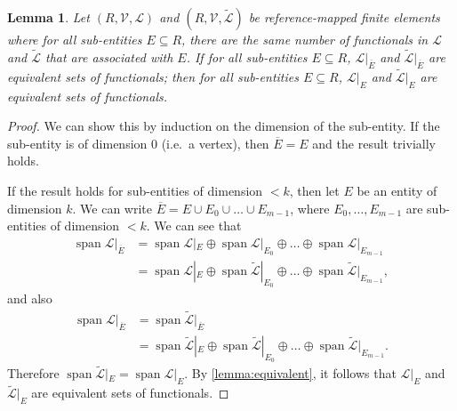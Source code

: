 \documentclass[sn-mathphys-num]{sn-jnl}%
\theoremstyle{thmstyleone}%
\newtheorem{lemma}{Lemma}%
\newcommand{\closure}[1]{\overline{#1}}
\newcommand{\subentity}{E}
\newcommand{\refel}{R}
\newcommand{\polyspace}{\mathcal{V}}
\newcommand{\dualbasis}{\mathcal{L}}
\theoremstyle{thmstyletwo}%
\theoremstyle{thmstylethree}%
\begin{document}
\begin{lemma}\label{lemma:fifth}
Let $(\refel,\polyspace,\dualbasis)$ and $(\refel,\polyspace,\tilde{\dualbasis})$ be reference-mapped finite elements
where for all sub-entities $\subentity\subseteq\refel$, there are the same number of functionals in $\dualbasis$ and $\tilde{\dualbasis}$ that are associated with $\subentity$.
If
for all sub-entities $\subentity\subseteq\refel$,
$\left.\dualbasis\right|_{\closure{\subentity}}$ and $\tilde{\dualbasis}|_{\closure{\subentity}}$
are equivalent sets of functionals;
then for all sub-entities $\subentity\subseteq\refel$,
$\left.\dualbasis\right|_{\subentity}$ and $\tilde{\dualbasis}|_{\subentity}$
are equivalent sets of functionals.
\end{lemma}
\begin{proof}
We can show this by induction on the dimension of the sub-entity.
If the sub-entity is of dimension 0 (i.e.~a vertex), then
$\closure{\subentity}=\subentity$ and the result trivially holds.

If the result holds for sub-entities of dimension $<k$, then let $\subentity$ be an entity
of dimension $k$.
We can write $\closure{\subentity}=\subentity \cup \subentity_0 \cup\dots\cup\subentity_{m-1}$,
where $\subentity_0,\dots,\subentity_{m-1}$ are sub-entities of dimension $<k$.
We can see that
\begin{align*}
\operatorname{span}\dualbasis|_{\closure{\subentity}}
&=
\operatorname{span}\dualbasis|_{\subentity}\oplus
\operatorname{span}\dualbasis|_{\subentity_0}\oplus\dots\oplus
\operatorname{span}\dualbasis|_{\subentity_{m-1}}
\\
&=
\operatorname{span}\dualbasis|_{\subentity}\oplus
\operatorname{span}\tilde{\dualbasis}|_{\subentity_0}\oplus\dots\oplus
\operatorname{span}\tilde{\dualbasis}|_{\subentity_{m-1}},
\end{align*}
and also
\begin{align*}
\operatorname{span}\dualbasis|_{\closure{\subentity}}
&=
\operatorname{span}\tilde{\dualbasis}|_{\closure{\subentity}}
\\&=
\operatorname{span}\tilde{\dualbasis}|_{\subentity}\oplus
\operatorname{span}\tilde{\dualbasis}|_{\subentity_0}\oplus\dots\oplus
\operatorname{span}\tilde{\dualbasis}|_{\subentity_{m-1}}.
\end{align*}
Therefore $\operatorname{span}\tilde{\dualbasis}|_{\subentity}=\operatorname{span}\dualbasis|_{\subentity}$.
By \cref{lemma:equivalent}, it follows that $\dualbasis|_{\subentity}$ and $\tilde{\dualbasis}|_{\subentity}$
are equivalent sets of functionals.
\end{proof}
\end{document}
